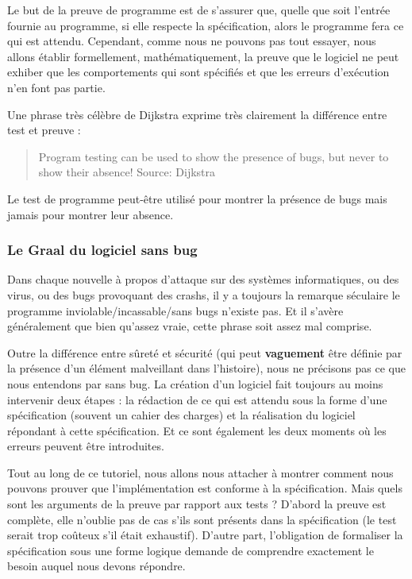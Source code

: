 \documentclass[12pt,francais,]{scrbook}
\begin{document}
Le but de la preuve de programme est de s'assurer que, quelle que soit
l'entrée fournie au programme, si elle respecte la spécification, alors
le programme fera ce qui est attendu. Cependant, comme nous ne pouvons
pas tout essayer, nous allons établir formellement, mathématiquement, la
preuve que le logiciel ne peut exhiber que les comportements qui sont
spécifiés et que les erreurs d'exécution n'en font pas partie.

Une phrase très célèbre de Dijkstra exprime très clairement la
différence entre test et preuve :

\begin{quote}
Program testing can be used to show the presence of bugs, but never to
show their absence! Source: Dijkstra
\end{quote}

Le test de programme peut-être utilisé pour montrer la présence de bugs
mais jamais pour montrer leur absence.

\subsubsection{Le Graal du logiciel sans
bug}\label{le-graal-du-logiciel-sans-bug}

Dans chaque nouvelle à propos d'attaque sur des systèmes informatiques,
ou des virus, ou des bugs provoquant des crashs, il y a toujours la
remarque séculaire \og{}le programme inviolable/incassable/sans bugs
n'existe pas\fg{}. Et il s'avère généralement que bien qu'assez vraie,
cette phrase soit assez mal comprise.

Outre la différence entre sûreté et sécurité (qui peut
\textbf{vaguement} être définie par la présence d'un élément malveillant
dans l'histoire), nous ne précisons pas ce que nous entendons par \og{}sans
bug\fg{}. La création d'un logiciel fait toujours au moins intervenir deux
étapes : la rédaction de ce qui est attendu sous la forme d'une
spécification (souvent un cahier des charges) et la réalisation du
logiciel répondant à cette spécification. Et ce sont également les deux
moments où les erreurs peuvent être introduites.

Tout au long de ce tutoriel, nous allons nous attacher à montrer comment
nous pouvons prouver que l'implémentation est conforme à la
spécification. Mais quels sont les arguments de la preuve par rapport
aux tests ? D'abord la preuve est complète, elle n'oublie pas de cas
s'ils sont présents dans la spécification (le test serait trop coûteux
s'il était exhaustif). D'autre part, l'obligation de formaliser la
spécification sous une forme logique demande de comprendre exactement le
besoin auquel nous devons répondre.
\end{document}
